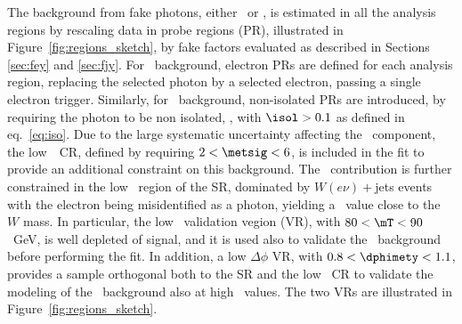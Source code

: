 The background from fake photons, either \efakey\ or \jfakey, is estimated in all the analysis regions by rescaling data in probe regions (PR), illustrated in Figure~\ref{fig:regions_sketch}, by fake factors evaluated as described in Sections \ref{sec:fey} and \ref{sec:fjy}. For \efakey\ background, electron PRs are defined for each analysis region, replacing the selected photon by a selected electron, passing a single electron trigger. Similarly, for \jfakey\ background, non-isolated PRs are introduced, by requiring the photon to be non isolated, \yNI, with $\isol>0.1$ as defined in eq.~\ref{eq:iso}. Due to the large systematic uncertainty affecting the \jfakey\ component, the low~\metsig~CR, defined by requiring $2 <\metsig <6 $, is included in the fit to provide an additional constraint on this background. The \efakey\ contribution is further constrained in the low \mT\ region of the SR, dominated by $W(e\nu)+$jets events with the electron being misidentified as a photon, yielding a \mT\ value close to the $W$ mass. In particular, the low \mT\ validation vegion (VR), with $80<\mT<90$~GeV, is well depleted of signal, and it is used also to validate the \efakey\ background before performing the fit. In addition, a low $\Delta\phi$ VR, with $0.8<\dphimety<1.1$, provides a sample orthogonal both to the SR and the low \metsig\ CR to validate the modeling of the \jfakey\ background also at high \metsig\ values. The two VRs are illustrated in Figure~\ref{fig:regions_sketch}.
